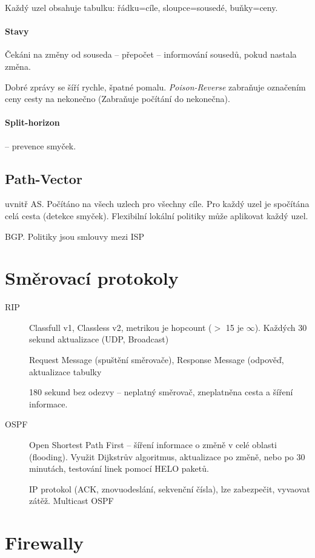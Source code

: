 \documentclass[a4paper, 11pt]{report}
\begin{document}
Každý uzel obsahuje tabulku: řádku=cíle, sloupce=sousedé, buňky=ceny.

\paragraph{Stavy} Čekáni na změny od souseda -- přepočet -- informování sousedů, pokud nastala změna.

Dobré zprávy se šíří rychle, špatné pomalu. \emph{Poison-Reverse} zabraňuje označením ceny cesty na nekonečno (Zabraňuje počítání do nekonečna).

\paragraph{Split-horizon} -- prevence smyček.

\subsection{Path-Vector}
uvnitř AS. Počítáno na všech uzlech pro všechny cíle. Pro každý uzel je spočítána celá cesta (detekce smyček). Flexibilní lokální politiky může aplikovat každý uzel.

BGP. Politiky jsou smlouvy mezi ISP


\section{Směrovací protokoly}
\begin{description}
	\item[RIP] Classfull v1, Classless v2, metrikou je hopcount ($>$ 15 je $\infty$). Každých 30 sekund aktualizace (UDP, Broadcast)
	
	Request Message (spuštění směrovače), Response Message (odpověď, aktualizace tabulky
	
	180 sekund bez odezvy -- neplatný směrovač, zneplatněna cesta a šíření informace.
	
	\item[OSPF] Open Shortest Path First -- šíření informace o změně v celé oblasti (flooding). Využit Dijkstrův algoritmus, aktualizace po změně, nebo po 30 minutách, testování linek pomocí HELO paketů.
	
	IP protokol (ACK, znovuodeslání, sekvenční čísla), lze zabezpečit, vyvaovat zátěž. Multicast OSPF
\end{description}

\section{Firewally}
\end{document}
